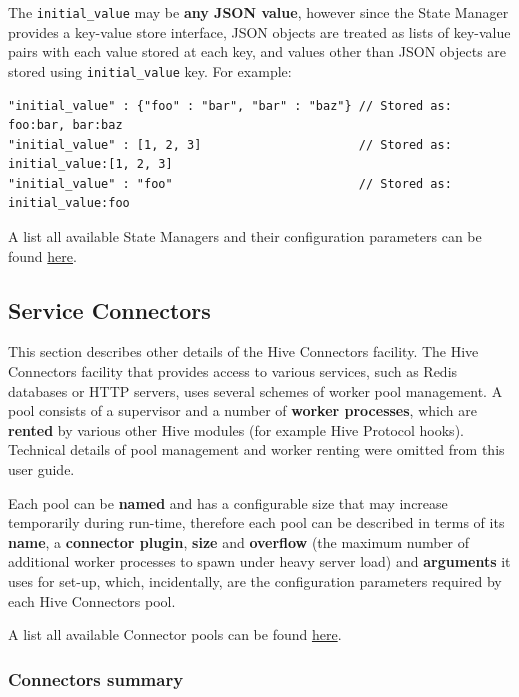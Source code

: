 \documentclass[a4paper]{article}
\begin{document}
The \texttt{initial\_value} may be \textbf{any JSON value}, however since the State Manager provides a key-value store interface, JSON objects are treated as lists of key-value pairs with each value stored at each key, and values other than JSON objects are stored using \texttt{initial\_value} key. For example:


\begin{verbatim}
"initial_value" : {"foo" : "bar", "bar" : "baz"} // Stored as:  foo:bar, bar:baz
"initial_value" : [1, 2, 3]                      // Stored as: initial_value:[1, 2, 3]
"initial_value" : "foo"                          // Stored as: initial_value:foo
\end{verbatim}




\noindent
A list all available State Managers and their configuration parameters can be found \hyperref[sec-9-5]{here}.

\pagebreak
\subsection{Service Connectors}
\label{sec-7-2}

This section describes other details of the Hive Connectors facility. The Hive Connectors facility that provides access to various services, such as Redis databases or HTTP servers, uses several schemes of worker pool management. A pool consists of a supervisor and a number of \textbf{worker processes}, which are \textbf{rented} by various other Hive modules (for example Hive Protocol hooks). Technical details of pool management and worker renting were omitted from this user guide.

Each pool can be \textbf{named} and has a configurable size that may increase temporarily during run-time, therefore each pool can be described in terms of its \textbf{name}, a \textbf{connector plugin}, \textbf{size} and \textbf{overflow} (the maximum number of additional worker processes to spawn under heavy server load) and \textbf{arguments} it uses for set-up, which, incidentally, are the configuration parameters required by each Hive Connectors pool.

\noindent
A list all available Connector pools can be found \hyperref[sec-9-4]{here}.
\subsubsection{Connectors summary}
\label{sec-7-2-1}
\end{document}
